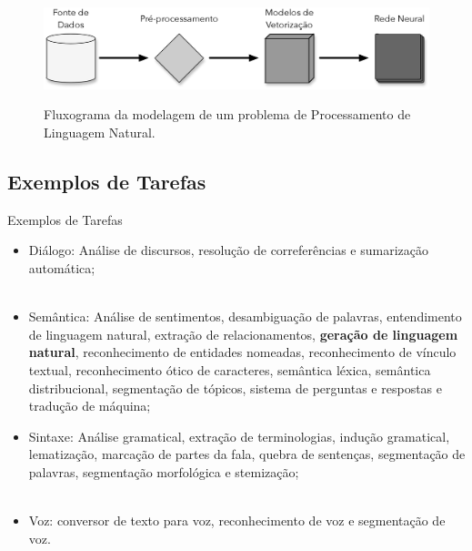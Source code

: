 \begin{frame}
	\begin{figure}[!ht]
		\centering
		\includegraphics[scale=0.4]{figs/nlp_workflow.eps}	
		\label{f.nlp_workflow}
		\caption{Fluxograma da modelagem de um problema de Processamento de Linguagem Natural.}
	\end{figure}
\end{frame}

\subsection{Exemplos de Tarefas}
\label{ss.tasks}

\begin{frame}{Exemplos de Tarefas}
	\justifying
	\begin{itemize}
		\item Diálogo: Análise de discursos, resolução de correferências e sumarização automática;
		\\~\\
		\item Semântica: Análise de sentimentos, desambiguação de palavras, entendimento de linguagem natural, extração de relacionamentos, \textbf{geração de linguagem natural}, reconhecimento de entidades nomeadas, reconhecimento de vínculo textual, reconhecimento ótico de caracteres, semântica léxica, semântica distribucional, segmentação de tópicos, sistema de perguntas e respostas e tradução de máquina;	
		\end{itemize}
\end{frame}

\begin{frame}
	\justifying
	\begin{itemize}
		\item Sintaxe: Análise gramatical, extração de terminologias, indução gramatical, lematização, marcação de partes da fala, quebra de sentenças, segmentação de palavras, segmentação morfológica e stemização;
		\\~\\
		\item Voz: conversor de texto para voz, reconhecimento de voz e segmentação de voz.
		\end{itemize}
\end{frame}

